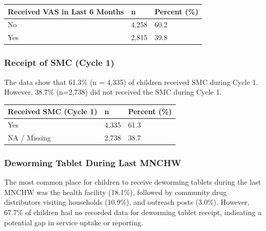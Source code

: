 \documentclass[
  11pt,
]{report}
\begin{document}
\begin{longtable}[]{@{}lll@{}}
\toprule\noalign{}
Received VAS in Last 6 Months & n & Percent (\%) \\
\midrule\noalign{}
\endhead
\bottomrule\noalign{}
\endlastfoot
No & 4,258 & 60.2 \\
Yes & 2,815 & 39.8 \\
\end{longtable}

\subsubsection{Receipt of SMC (Cycle 1)}\label{receipt-of-smc-cycle-1}

The data show that 61.3\% (n = 4,335) of children received SMC during
Cycle 1. However, 38.7\% (n=2,738) did not received the SMC during Cycle
1.

\begin{longtable}[]{@{}lll@{}}
\toprule\noalign{}
Received SMC (Cycle 1) & n & Percent (\%) \\
\midrule\noalign{}
\endhead
\bottomrule\noalign{}
\endlastfoot
Yes & 4,335 & 61.3 \\
NA / Missing & 2,738 & 38.7 \\
\end{longtable}

\subsubsection{Deworming Tablet During Last
MNCHW}\label{deworming-tablet-during-last-mnchw}

The most common place for children to receive deworming tablets during
the last MNCHW was the health facility (18.1\%), followed by community
drug distributors visiting households (10.9\%), and outreach posts
(3.0\%). However, 67.7\% of children had no recorded data for deworming
tablet receipt, indicating a potential gap in service uptake or
reporting.
\end{document}
